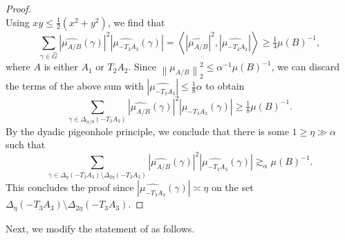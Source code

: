 \documentclass{daj}
\theoremstyle{definition}
\newcommand{\m}[1]{\mu_{#1}}
\newcommand{\mh}[1]{\widehat{\mu_{#1}}}
\newcommand{\inner}[2]{\left\langle#1, #2\right\rangle}
\newcommand{\norm}[1]{\left\|#1\right\|}
\newcommand{\geqs}[1]{\gtrsim_{#1}}
\begin{document}
\begin{proof}
\begin{equation*}
\end{equation*}
Using $xy\leq \tfrac12 (x^2+y^2)$, we find that 
\begin{equation*}
\sum_{\gamma \in \widehat{G}} |\mh{A/B}(\gamma)|^2|\mh{-T_3A_3}(\gamma)| = \inner{|\mh{A/B}|^2}{|\mh{-T_3A_3}|}\geq \tfrac{1}{4} \mu(B)^{-1},
\end{equation*}
where $A$ is either $A_1$ or $T_2A_2$. Since $\norm{\m{A/B}}_2^2\leq \alpha^{-1}\mu(B)^{-1}$, we can discard the terms of the above sum with $|\mh{-T_3A_3}| \leq \tfrac{1}{8}\alpha$ to obtain
\begin{equation*}
\sum_{\gamma \in \Delta_{\alpha/8}(-T_3A_3)} |\mh{A/B}(\gamma)|^2|\mh{-T_3A_3}(\gamma)| \geq \tfrac{1}{8} \mu(B)^{-1}.
\end{equation*}
By the dyadic pigeonhole principle, we conclude that there is some $1 \geq \eta \gg \alpha$ such that 
\begin{equation*}
\sum_{\gamma \in \Delta_{\eta}(-T_3A_3) \setminus  \Delta_{2\eta}(-T_3A_3) } |\mh{A/B}(\gamma)|^2|\mh{-T_3A_3}(\gamma)| \geqs{\alpha} \mu(B)^{-1}.
\end{equation*}
This concludes the proof since $|\mh{-T_3A_3}(\gamma)| \asymp \eta$ on the set $\Delta_{\eta}(-T_3A_3) \setminus  \Delta_{2\eta}(-T_3A_3)$.
\end{proof}

Next, we modify the statement of \cite[Proposition~8.1]{BS} as follows.
\end{document}
